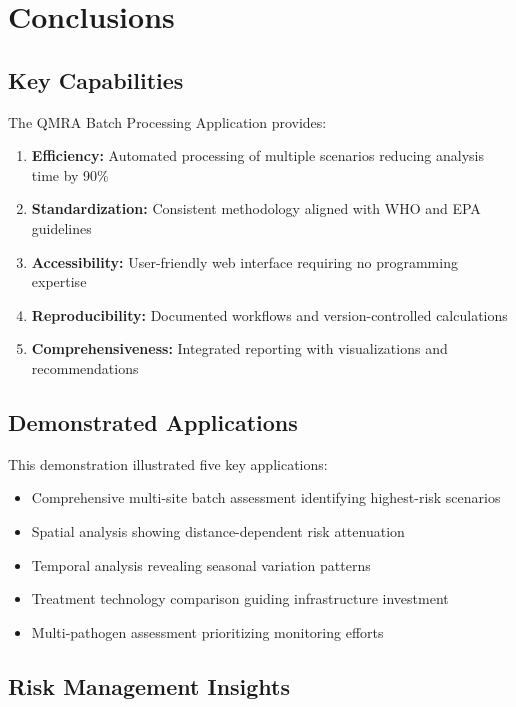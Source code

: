 \documentclass[11pt,a4paper]{article}
\begin{document}
\newpage

\section{Conclusions}

\subsection{Key Capabilities}

The QMRA Batch Processing Application provides:

\begin{enumerate}[leftmargin=*]
    \item \textbf{Efficiency:} Automated processing of multiple scenarios reducing analysis time by 90\%
    \item \textbf{Standardization:} Consistent methodology aligned with WHO and EPA guidelines
    \item \textbf{Accessibility:} User-friendly web interface requiring no programming expertise
    \item \textbf{Reproducibility:} Documented workflows and version-controlled calculations
    \item \textbf{Comprehensiveness:} Integrated reporting with visualizations and recommendations
\end{enumerate}

\subsection{Demonstrated Applications}

This demonstration illustrated five key applications:
\begin{itemize}[leftmargin=*]
    \item Comprehensive multi-site batch assessment identifying highest-risk scenarios
    \item Spatial analysis showing distance-dependent risk attenuation
    \item Temporal analysis revealing seasonal variation patterns
    \item Treatment technology comparison guiding infrastructure investment
    \item Multi-pathogen assessment prioritizing monitoring efforts
\end{itemize}

\subsection{Risk Management Insights}
\end{document}
